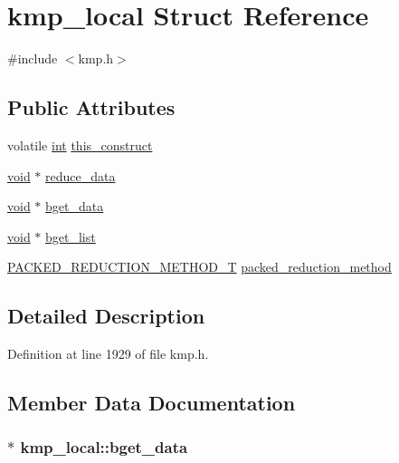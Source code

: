 \hypertarget{structkmp__local}{\section{kmp\-\_\-local Struct Reference}
\label{structkmp__local}
}


{\ttfamily \#include $<$kmp.\-h$>$}

\subsection*{Public Attributes}
\begin{DoxyCompactItemize}
\item 
volatile \hyperlink{ittnotify__static_8h_a8b8dcd723308a8cb5d84277c7a3fff70}{int} \hyperlink{structkmp__local_ae1dbf9207545d97a14c37d5fbeb4a4b8}{this\-\_\-construct}
\item 
\hyperlink{ittnotify__static_8h_af941d56e55e3c5465135b60c4d6343ed}{void} $\ast$ \hyperlink{structkmp__local_a4c051e7be68eeeda40a045f7bf9e31c3}{reduce\-\_\-data}
\item 
\hyperlink{ittnotify__static_8h_af941d56e55e3c5465135b60c4d6343ed}{void} $\ast$ \hyperlink{structkmp__local_a31350df36649959b42aaa9478083ab80}{bget\-\_\-data}
\item 
\hyperlink{ittnotify__static_8h_af941d56e55e3c5465135b60c4d6343ed}{void} $\ast$ \hyperlink{structkmp__local_a3a0e1b35577fdbd6a0a0baead836840c}{bget\-\_\-list}
\item 
\hyperlink{kmp_8h_a79cdcd03cc0f2498719630411d56ef84}{P\-A\-C\-K\-E\-D\-\_\-\-R\-E\-D\-U\-C\-T\-I\-O\-N\-\_\-\-M\-E\-T\-H\-O\-D\-\_\-\-T} \hyperlink{structkmp__local_ab9ff578e63fb39dbc41446e9151ef801}{packed\-\_\-reduction\-\_\-method}
\end{DoxyCompactItemize}


\subsection{Detailed Description}


Definition at line 1929 of file kmp.\-h.



\subsection{Member Data Documentation}
\hypertarget{structkmp__local_a31350df36649959b42aaa9478083ab80}{
\subsubsection[{bget\-\_\-data}]{$\ast$ kmp\-\_\-local\-::bget\-\_\-data}}\label{structkmp__local_a31350df36649959b42aaa9478083ab80}


